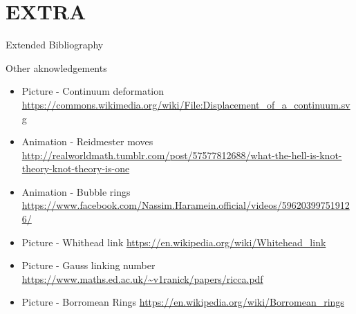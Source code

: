 \documentclass[handout,10pt]{beamer}
\begin{document}
 
\appendix
\section{EXTRA}


\begin{frame}[t,allowframebreaks]{Extended Bibliography}
	
	
\end{frame}

\begin{frame}[t]{Other aknowledgements}
	\begin{itemize}
		\item Picture - Continuum deformation
			\url{https://commons.wikimedia.org/wiki/File:Displacement_of_a_continuum.svg}
		\item Animation - Reidmester moves
			\url{http://realworldmath.tumblr.com/post/57577812688/what-the-hell-is-knot-theory-knot-theory-is-one}
		\item Animation - Bubble rings
			\url{https://www.facebook.com/Nassim.Haramein.official/videos/596203997519126/}
		\item Picture - Whithead link 
			\url{https://en.wikipedia.org/wiki/Whitehead_link}
		\item Picture - Gauss linking number 
			\url{https://www.maths.ed.ac.uk/~v1ranick/papers/ricca.pdf}
		\item Picture - Borromean Rings
			\url{https://en.wikipedia.org/wiki/Borromean_rings}

	\end{itemize}
\end{frame}



\end{document}
